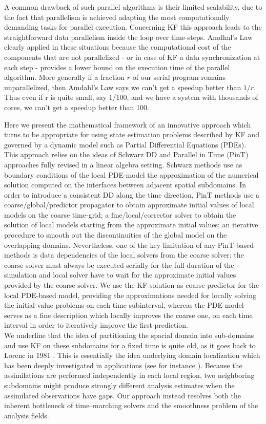 \documentclass[smallcondensed]{svjour3}
\begin{document}
A common drawback of such parallel algorithms is their limited scalability, due to the fact that parallelism is achieved adapting  the most computationally demanding tasks  for parallel execution. Concerning KF  this approach leads to the straightforward data parallelism inside the loop over time-steps.  
Amdhal's Law clearly applied in these situations because the computational cost of the components that are not parallelized - or in case of KF a data synchronization at each step -  provides a lower bound on the execution time of the parallel algorithm.  More generally if a fraction $r$  of our serial program remains unparallelized, then
Amdahl's Law says we can't get a speedup better than  $1/r$. Thus even if r is quite small, say 1/100, and we have a system with thousands of cores, we can't get a speedup better than 100.

\noindent Here we present the mathematical framework of an innovative approach which turns to be appropriate for using state estimation problems described by KF and governed by a dynamic model such as Partial Differential Equations (PDEs).  This approach  relies on the ideas of  Schwarz DD  \cite{Schwarz} and Parallel in Time (PinT) approaches \cite{Lions} fully revised in a linear algebra setting.  Schwarz methods  use as boundary conditions of the local PDE-model the approximation of the numerical solution computed on the interfaces between adjacent spatial subdomains. In order to introduce a consistent DD along the time direction,  PinT methods use a coarse/global/predictor propagator to obtain approximate initial values of local models on the coarse time-grid;  a fine/local/corrector solver to obtain the solution of local models starting from the approximate initial values; 
 an iterative procedure to smooth out the discontinuities of the global model on the overlapping domains. 
Nevertheless, one of the key limitation  of any PinT-based methods is data dependencies of the local solvers from the coarse solver: the coarse solver must always be executed serially for the full duration of the simulation and local solver have to wait for the approximate initial values provided by the coarse solver. We  use the KF solution  as coarse predictor for the local PDE-based  model, providing the approximations needed  for locally solving  the initial value problems on each time subinterval,  whereas the PDE model serves as a fine description which locally improves the coarse one, on each time interval in order to iteratively improve the first prediction.  \\
 We underline that the idea of partitioning the spacial domain into sub-domains and use KF on these subdomains for a fixed time is quite old, as it goes back to Lorenc in 1981 \cite{Lorenc1981}. This is essentially the idea underlying domain localization which has been   deeply investigated in applications (see for instance \cite{Brankart,Brusdal,Haugen,Nerger2006,Ott}). Because the assimilations are performed independently in each local region, two neighboring subdomains might produce strongly different analysis estimates when the assimilated observations have
gaps. Our approach instead  resolves both the inherent bottleneck of time--marching solvers and the smoothness problem of the analysis fields. 
\end{document}
